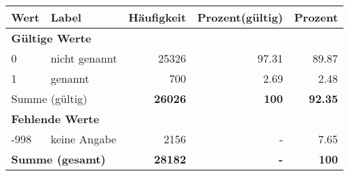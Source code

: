      \begin{longtable}{lXrrr}
     \toprule
     \textbf{Wert} & \textbf{Label} & \textbf{Häufigkeit} & \textbf{Prozent(gültig)} & \textbf{Prozent} \\
     \endhead
     \midrule
     \multicolumn{5}{l}{\textbf{Gültige Werte}}\\

     0 &
     \multicolumn{1}{X}{ nicht genannt   } &


       \num{25326} &
       \num[round-mode=places,round-precision=2]{97,31} &
         \num[round-mode=places,round-precision=2]{89,87} \\

     1 &
     \multicolumn{1}{X}{ genannt   } &


       \num{700} &
       \num[round-mode=places,round-precision=2]{2,69} &
         \num[round-mode=places,round-precision=2]{2,48} \\
     \midrule
     \multicolumn{2}{l}{Summe (gültig)} &
       \textbf{\num{26026}} &
     \textbf{100} &
       \textbf{\num[round-mode=places,round-precision=2]{92,35}} \\
     \multicolumn{5}{l}{\textbf{Fehlende Werte}}\\
       -998 &
       keine Angabe &
         \num{2156} &
        - &
         \num[round-mode=places,round-precision=2]{7,65} \\
     \midrule
     \multicolumn{2}{l}{\textbf{Summe (gesamt)}} &
          \textbf{\num{28182}} &
        \textbf{-} &
        \textbf{100} \\
     \bottomrule
     \end{longtable}
     
